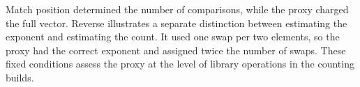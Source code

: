Match position determined the number of comparisons, while the proxy charged the full vector. Reverse illustrates a separate distinction between estimating the exponent and estimating the count. It used one swap per two elements, so the proxy had the correct exponent and assigned twice the number of swaps. These fixed conditions assess the proxy at the level of library operations in the counting builds.
